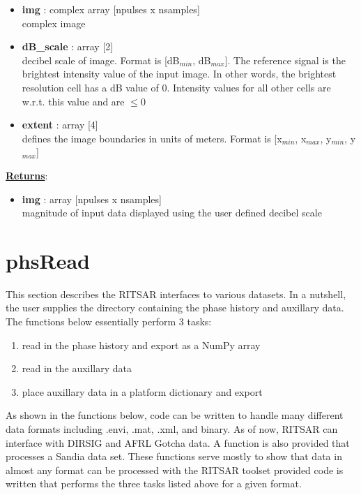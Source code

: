 \documentclass{article}
\newcommand{\defs}[2]{\textbf{{#1}} : {#2}}
\begin{document}
\begin{itemize}
	\item \defs{img}{complex array [npulses x nsamples]}\\
  		complex image
  	\item \defs{dB\_scale}{array [2]}\\
  		decibel scale of image.  Format is [dB$_{min}$, dB$_{max}$].  The reference signal is the brightest intensity value of the input image.  In other words, the brightest resolution cell has a dB value of 0.  Intensity values for all other cells are w.r.t. this value and are $\leq0$
  	\item \defs{extent}{array [4]}\\
  	  		defines the image boundaries in units of meters.  Format is [x$_{min}$, x$_{max}$, y$_{min}$, y$_{max}$]
  	
\end{itemize}

\noindent \underline{\textbf{Returns}}:
\begin{itemize}
	\item \defs{img}{array [npulses x nsamples]}\\
	magnitude of input data displayed using the user defined decibel scale
\end{itemize}

\newpage
\section{phsRead}
This section describes the RITSAR interfaces to various datasets.  In a nutshell, the user supplies the directory containing the phase history and auxillary data.  The functions below essentially perform 3 tasks:
\begin{enumerate}
\item read in the phase history and export as a NumPy array
\item read in the auxillary data
\item place auxillary data in a platform dictionary and export
\end{enumerate}
As shown in the functions below, code can be written to handle many different data formats including .envi, .mat, .xml, and binary.  As of now, RITSAR can interface with DIRSIG and AFRL Gotcha data.  A function is also provided that processes a Sandia data set.  These functions serve mostly to show that data in almost any format can be processed with the RITSAR toolset provided code is written that performs the three tasks listed above for a given format.
\end{document}
